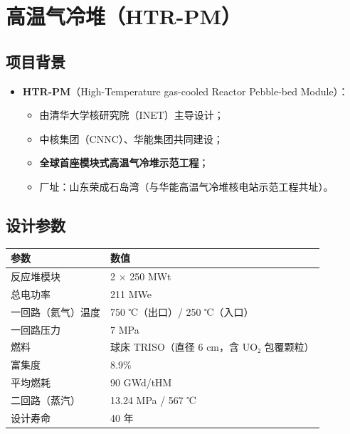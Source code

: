 \documentclass[
  UTF8,
  scheme=plain,
  fontsize=10pt,
  openany
]{ctexbook}
\begin{document}
\section{高温气冷堆（HTR-PM）}\label{ux9ad8ux6e29ux6c14ux51b7ux5806htr-pm}

\subsection{项目背景}\label{ux9879ux76eeux80ccux666f}

\begin{itemize}
\tightlist
\item
  \textbf{HTR-PM}（High-Temperature gas-cooled Reactor Pebble-bed
  Module）：

  \begin{itemize}
  \tightlist
  \item
    由清华大学核研究院（INET）主导设计；
  \item
    中核集团（CNNC）、华能集团共同建设；
  \item
    \textbf{全球首座模块式高温气冷堆示范工程}；
  \item
    厂址：山东荣成石岛湾（与华能高温气冷堆核电站示范工程共址）。
  \end{itemize}
\end{itemize}

\subsection{设计参数}\label{ux8bbeux8ba1ux53c2ux6570}

{\def\LTcaptype{none} %
\begin{longtable}[]{@{}ll@{}}
\toprule\noalign{}
参数 & 数值 \\
\midrule\noalign{}
\endhead
\bottomrule\noalign{}
\endlastfoot
反应堆模块 & 2 × 250 MWt \\
总电功率 & 211 MWe \\
一回路（氦气）温度 & 750 ℃（出口）/ 250 ℃（入口） \\
一回路压力 & 7 MPa \\
燃料 & 球床 TRISO（直径 6 cm，含 UO₂ 包覆颗粒） \\
富集度 & 8.9\% \\
平均燃耗 & 90 GWd/tHM \\
二回路（蒸汽） & 13.24 MPa / 567 ℃ \\
设计寿命 & 40 年 \\
\end{longtable}
}
\end{document}
